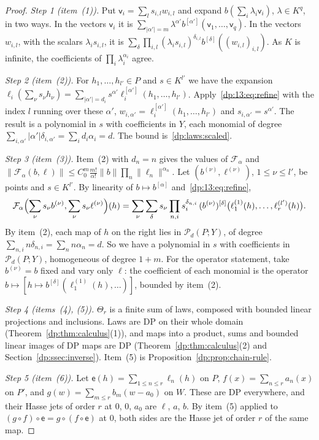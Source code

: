 \documentclass[11pt]{amsart}
\theoremstyle{definition}
\theoremstyle{remark}
\numberwithin{equation}{section}
\newcommand{\abs}[1]{\lvert #1\rvert}
\newcommand{\norm}[1]{\lVert #1\rVert}
\theoremstyle{plain}
\theoremstyle{definition}
\theoremstyle{plain}
\newcommand{\cP}{\mathcal P}
\begin{document}
\begin{proof}
\emph{Step 1 (item~(1)).} Put $\mathsf v_i=\sum_ls_{i,l}w_{i,l}$ and expand $b(\sum_i\lambda_i\mathsf v_i)$, $\lambda\in K^q$, in two ways. In the vectors $\mathsf v_i$ it is $\sum_{\abs{\alpha'}=m}\lambda^{\alpha'}b^{[\alpha']}(\mathsf v_1,\dots,\mathsf v_q)$. In the vectors $w_{i,l}$, with the scalars $\lambda_is_{i,l}$, it is $\sum_\delta\prod_{i,l}(\lambda_is_{i,l})^{\delta_{i,l}}b^{[\delta]}((w_{i,l})_{i,l})$. As $K$ is infinite, the coefficients of $\prod_i\lambda_i^{\alpha_i}$ agree.

\emph{Step 2 (item~(2)).} For $h_1,\dots,h_{l'}\in P$ and $s\in K^{l'}$ we have the expansion $\ell_i(\sum_\nu s_\nu h_\nu)=\sum_{\abs{\alpha'}=d_i}s^{\alpha'}\ell_i^{[\alpha']}(h_1,\dots,h_{l'})$. Apply~\eqref{dp:13:eq:refine} with the index $l$ running over these $\alpha'$, $w_{i,\alpha'}=\ell_i^{[\alpha']}(h_1,\dots,h_{l'})$ and $s_{i,\alpha'}=s^{\alpha'}$. The result is a polynomial in $s$ with coefficients in $Y$, each monomial of degree $\sum_{i,\alpha'}\abs{\alpha'}\delta_{i,\alpha'}=\sum_id_i\alpha_i=d$. The bound is~\eqref{dp:laws:scaled}.

\emph{Step 3 (item~(3)).} Item~(2) with $d_n=n$ gives the values of $\mathcal F_\alpha$ and $\norm{\mathcal F_\alpha(b,\ell)}\le C_0^m\frac{m!}{\alpha!}\norm b\prod_n\norm{\ell_n}^{\alpha_n}$. Let $(b^{(\nu)},\ell^{(\nu)})$, $1\le\nu\le l'$, be points and $s\in K^{l'}$. By linearity of $b\mapsto b^{[\alpha]}$ and~\eqref{dp:13:eq:refine},
\[
 \mathcal F_\alpha\Bigl(\sum_\nu s_\nu b^{(\nu)},\sum_\nu s_\nu\ell^{(\nu)}\Bigr)(h)=\sum_\nu\sum_\delta s_\nu\prod_{n,i}s_i^{\delta_{n,i}}\,(b^{(\nu)})^{[\delta]}\bigl(\ell^{(1)}_1(h),\dots,\ell^{(l')}_r(h)\bigr).
\]
By item~(2), each map of $h$ on the right lies in $\cP_d(P;Y)$, of degree $\sum_{n,i}n\delta_{n,i}=\sum_nn\alpha_n=d$. So we have a polynomial in $s$ with coefficients in $\cP_d(P;Y)$, homogeneous of degree $1+m$. For the operator statement, take $b^{(\nu)}=b$ fixed and vary only $\ell$: the coefficient of each monomial is the operator $b\mapsto[h\mapsto b^{[\delta]}(\ell^{(1)}_1(h),\dots)]$, bounded by item~(2).

\emph{Step 4 (items~(4), (5)).} $\Theta_r$ is a finite sum of laws, composed with bounded linear projections and inclusions. Laws are DP on their whole domain (Theorem~\ref{dp:thm:calculus}(1)), and maps into a product, sums and bounded linear images of DP maps are DP (Theorem~\ref{dp:thm:calculus}(2) and Section~\ref{dp:ssec:inverse}). Item~(5) is Proposition~\ref{dp:prop:chain-rule}.

\emph{Step 5 (item~(6)).} Let $\mathsf e(h)=\sum_{1\le n\le r}\ell_n(h)$ on $P$, $f(x)=\sum_{n\le r}a_n(x)$ on $P'$, and $g(w)=\sum_{m\le r}b_m(w-a_0)$ on $W$. These are DP everywhere, and their Hasse jets of order $r$ at $0$, $0$, $a_0$ are $\ell$, $a$, $b$. By item~(5) applied to $(g\circ f)\circ\mathsf e=g\circ(f\circ\mathsf e)$ at $0$, both sides are the Hasse jet of order $r$ of the same map.
\end{proof}
\end{document}
